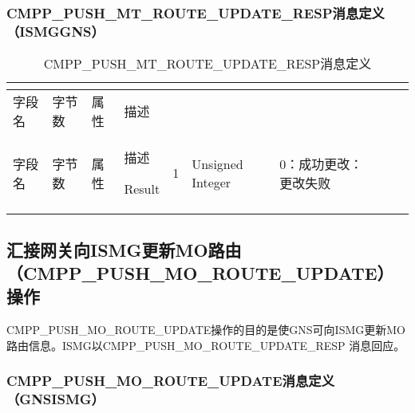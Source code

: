 \documentclass[11pt]{book} %
\begin{document}
\subsubsection{CMPP\_PUSH\_MT\_ROUTE\_UPDATE\_RESP消息定义（ISMG\textrightarrow GNS）}



\begin{longtable}{|m{90pt}|m{35pt}|m{80pt}|m{200pt}|}
\tabularnewline\hline
字段名&字节数&属性&描述
\endhead

\caption{CMPP\_PUSH\_MT\_ROUTE\_UPDATE\_RESP消息定义}\\
\hline
字段名&字节数&属性&描述
\endfirsthead

\endfoot

\endlastfoot

\hline
Result&1&Unsigned Integer&0：成功更改：更改失败\\
\hline
\end{longtable}



\subsection{汇接网关向ISMG更新MO路由（CMPP\_PUSH\_MO\_ROUTE\_UPDATE）操作}


CMPP\_PUSH\_MO\_ROUTE\_UPDATE操作的目的是使GNS可向ISMG更新MO路由信息。ISMG以CMPP\_PUSH\_MO\_ROUTE\_UPDATE\_RESP 消息回应。



%
%
%
%
%



\subsubsection{CMPP\_PUSH\_MO\_ROUTE\_UPDATE消息定义（GNS\textrightarrow ISMG）}
\end{document}
